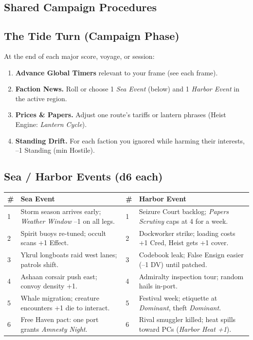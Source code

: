 \documentclass[11pt,oneside]{book}
\begin{document}
\begin{itemize}
\section{Shared Campaign Procedures}

\subsection*{The Tide Turn (Campaign Phase)}
At the end of each major score, voyage, or session:
\begin{enumerate}[leftmargin=*,itemsep=2pt]
  \item \textbf{Advance Global Timers} relevant to your frame (see each frame).
  \item \textbf{Faction News.} Roll or choose 1 \emph{Sea Event} (below) and 1 \emph{Harbor Event} in the active region.
  \item \textbf{Prices \& Papers.} Adjust one route's tariffs or lantern phrases (Heist Engine: \emph{Lantern Cycle}).
  \item \textbf{Standing Drift.} For each faction you ignored while harming their interests, --1 Standing (min Hostile).
\end{enumerate}

\subsection*{Sea / Harbor Events (d6 each)}
\begin{tabularx}{\linewidth}{@{}p{0.6cm} X p{0.6cm} X@{}}
\toprule
\# & \textbf{Sea Event} & \# & \textbf{Harbor Event}\\
\midrule
1 & Storm season arrives early; \emph{Weather Window} --1 on all legs. & 1 & Seizure Court backlog; \emph{Papers Scrutiny} caps at 4 for a week.\\
2 & Spirit buoys re-tuned; occult scans +1 Effect. & 2 & Dockworker strike; loading costs +1 Cred, Heist gets +1 cover.\\
3 & Ykrul longboats raid west lanes; patrols shift. & 3 & Codebook leak; False Ensign easier (--1 DV) until patched.\\
4 & Ashaan corsair push east; convoy density +1. & 4 & Admiralty inspection tour; random hails in-port.\\
5 & Whale migration; creature encounters +1 die to interact. & 5 & Festival week; etiquette at \emph{Dominant}, theft \emph{Dominant}.\\
6 & Free Haven pact: one port grants \emph{Amnesty Night}. & 6 & Rival smuggler killed; heat spills toward PCs (\emph{Harbor Heat +1}).\\
\bottomrule
\end{tabularx}


\end{itemize}
\end{document}
